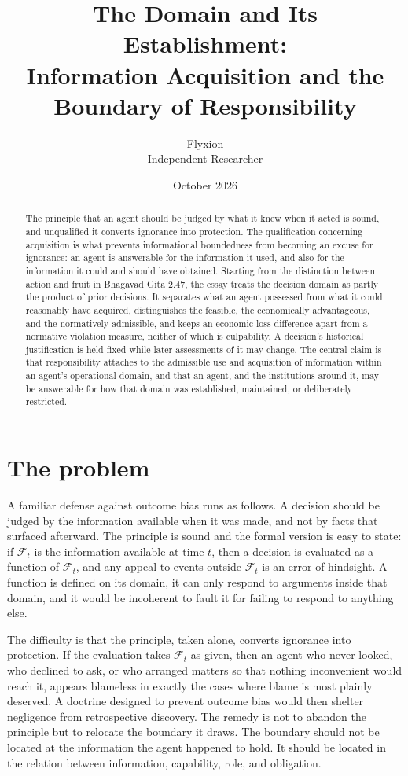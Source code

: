 \documentclass[11pt]{article}
\title{The Domain and Its Establishment:\\Information Acquisition and the Boundary of Responsibility}
\author{Flyxion\\Independent Researcher}
\date{October 2026}
\newcommand{\F}{\mathcal F}
\theoremstyle{definition}
\begin{document}
\maketitle

\begin{abstract}
\noindent The principle that an agent should be judged by what it knew when it acted is sound, and unqualified it converts ignorance into protection. The qualification concerning acquisition is what prevents informational boundedness from becoming an excuse for ignorance: an agent is answerable for the information it used, and also for the information it could and should have obtained. Starting from the distinction between action and fruit in Bhagavad Gita 2.47, the essay treats the decision domain as partly the product of prior decisions. It separates what an agent possessed from what it could reasonably have acquired, distinguishes the feasible, the economically advantageous, and the normatively admissible, and keeps an economic loss difference apart from a normative violation measure, neither of which is culpability. A decision's historical justification is held fixed while later assessments of it may change. The central claim is that responsibility attaches to the admissible use and acquisition of information within an agent's operational domain, and that an agent, and the institutions around it, may be answerable for how that domain was established, maintained, or deliberately restricted.
\end{abstract}

\section{The problem}

A familiar defense against outcome bias runs as follows. A decision should be judged by the information available when it was made, and not by facts that surfaced afterward. The principle is sound and the formal version is easy to state: if $\F_t$ is the information available at time $t$, then a decision is evaluated as a function of $\F_t$, and any appeal to events outside $\F_t$ is an error of hindsight. A function is defined on its domain, it can only respond to arguments inside that domain, and it would be incoherent to fault it for failing to respond to anything else.

The difficulty is that the principle, taken alone, converts ignorance into protection. If the evaluation takes $\F_t$ as given, then an agent who never looked, who declined to ask, or who arranged matters so that nothing inconvenient would reach it, appears blameless in exactly the cases where blame is most plainly deserved. A doctrine designed to prevent outcome bias would then shelter negligence from retrospective discovery. The remedy is not to abandon the principle but to relocate the boundary it draws. The boundary should not be located at the information the agent happened to hold. It should be located in the relation between information, capability, role, and obligation.
\end{document}

